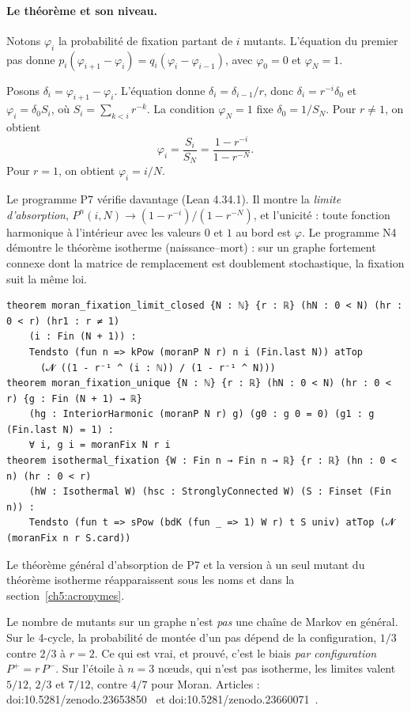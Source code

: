 \paragraph{Le théorème et son niveau.} Notons $\varphi_i$ la probabilité de fixation partant de $i$ mutants. L'équation
du premier pas donne $p_i(\varphi_{i+1}-\varphi_i)=q_i(\varphi_i-\varphi_{i-1})$, avec $\varphi_0=0$ et
$\varphi_N=1$.
\begin{humanproof}
Posons $\delta_i=\varphi_{i+1}-\varphi_i$. L'équation donne $\delta_i=\delta_{i-1}/r$, donc $\delta_i=r^{-i}\delta_0$
et $\varphi_i=\delta_0S_i$, où $S_i=\sum_{k<i}r^{-k}$. La condition $\varphi_N=1$ fixe
$\delta_0=1/S_N$. Pour $r\ne1$, on obtient
\[\varphi_i=\frac{S_i}{S_N}=\frac{1-r^{-i}}{1-r^{-N}} .\]
Pour $r=1$, on obtient $\varphi_i=i/N$.
\end{humanproof}
Le programme P7 vérifie davantage \tierA{} (Lean 4.34.1). Il montre la \emph{limite d'absorption},
$P^n(i,N)\to(1-r^{-i})/(1-r^{-N})$, et l'unicité : toute fonction harmonique à l'intérieur avec les valeurs $0$ et
$1$ au bord est $\varphi$. Le programme N4 démontre le théorème isotherme (naissance--mort) : sur un graphe
fortement connexe dont la matrice de remplacement est doublement stochastique, la fixation suit la même loi.
\begin{leanbox}
\begin{lstlisting}[language=Lean]
theorem moran_fixation_limit_closed {N : ℕ} {r : ℝ} (hN : 0 < N) (hr : 0 < r) (hr1 : r ≠ 1)
    (i : Fin (N + 1)) :
    Tendsto (fun n => kPow (moranP N r) n i (Fin.last N)) atTop
      (𝓝 ((1 - r⁻¹ ^ (i : ℕ)) / (1 - r⁻¹ ^ N)))
theorem moran_fixation_unique {N : ℕ} {r : ℝ} (hN : 0 < N) (hr : 0 < r) {g : Fin (N + 1) → ℝ}
    (hg : InteriorHarmonic (moranP N r) g) (g0 : g 0 = 0) (g1 : g (Fin.last N) = 1) :
    ∀ i, g i = moranFix N r i
theorem isothermal_fixation {W : Fin n → Fin n → ℝ} {r : ℝ} (hn : 0 < n) (hr : 0 < r)
    (hW : Isothermal W) (hsc : StronglyConnected W) (S : Finset (Fin n)) :
    Tendsto (fun t => sPow (bdK (fun _ => 1) W r) t S univ) atTop (𝓝 (moranFix n r S.card))
\end{lstlisting}
\end{leanbox}
Le théorème général d'absorption de P7 et la version à un seul mutant du théorème isotherme réapparaissent sous
les noms  et  dans la section~\ref{ch5:acronymes}.

Le nombre de mutants sur un graphe n'est \emph{pas} une chaîne de Markov en général. Sur le 4-cycle, la probabilité de
montée d'un pas dépend de la configuration, $1/3$ contre $2/3$ à $r=2$. Ce qui est vrai, et prouvé, c'est le biais
\emph{par configuration} $P^+=r\,P^-$. Sur l'étoile à $n=3$ nœuds, qui n'est pas isotherme, les limites valent
$5/12$, $2/3$ et $7/12$, contre $4/7$ pour Moran. Articles : doi:10.5281/zenodo.23653850~\cite{ch4:P7} et
doi:10.5281/zenodo.23660071~\cite{ch4:N4}.


